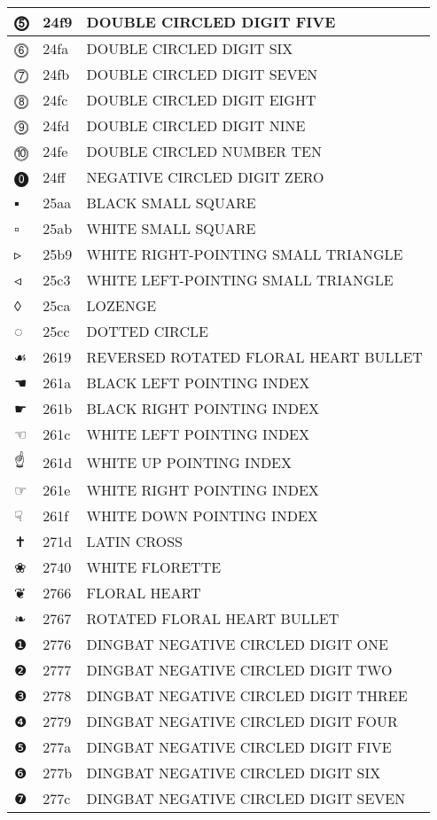 \documentclass[12pt,letterpaper,openany]{book}
\begin{document}
\begin{center}
\begin{supertabular}{|m{0.25in}|m{0.5in}|m{4in}|}
⓹ & 24f9 & DOUBLE CIRCLED DIGIT FIVE\\\hline
⓺ & 24fa & DOUBLE CIRCLED DIGIT SIX\\\hline
⓻ & 24fb & DOUBLE CIRCLED DIGIT SEVEN\\\hline
⓼ & 24fc & DOUBLE CIRCLED DIGIT EIGHT\\\hline
⓽ & 24fd & DOUBLE CIRCLED DIGIT NINE\\\hline
⓾ & 24fe & DOUBLE CIRCLED NUMBER TEN\\\hline
⓿ & 24ff & NEGATIVE CIRCLED DIGIT ZERO\\\hline
▪ & 25aa & BLACK SMALL SQUARE\\\hline
▫ & 25ab & WHITE SMALL SQUARE\\\hline
▹ & 25b9 & WHITE RIGHT-POINTING SMALL TRIANGLE\\\hline
◃ & 25c3 & WHITE LEFT-POINTING SMALL TRIANGLE\\\hline
◊ & 25ca & LOZENGE\\\hline
◌ & 25cc & DOTTED CIRCLE\\\hline
☙ & 2619 & REVERSED ROTATED FLORAL HEART BULLET\\\hline
☚ & 261a & BLACK LEFT POINTING INDEX\\\hline
☛ & 261b & BLACK RIGHT POINTING INDEX\\\hline
☜ & 261c & WHITE LEFT POINTING INDEX\\\hline
☝ & 261d & WHITE UP POINTING INDEX\\\hline
☞ & 261e & WHITE RIGHT POINTING INDEX\\\hline
☟ & 261f & WHITE DOWN POINTING INDEX\\\hline
✝ & 271d & LATIN CROSS\\\hline
❀ & 2740 & WHITE FLORETTE\\\hline
❦ & 2766 & FLORAL HEART\\\hline
❧ & 2767 & ROTATED FLORAL HEART BULLET\\\hline
❶ & 2776 & DINGBAT NEGATIVE CIRCLED DIGIT ONE\\\hline
❷ & 2777 & DINGBAT NEGATIVE CIRCLED DIGIT TWO\\\hline
❸ & 2778 & DINGBAT NEGATIVE CIRCLED DIGIT THREE\\\hline
❹ & 2779 & DINGBAT NEGATIVE CIRCLED DIGIT FOUR\\\hline
❺ & 277a & DINGBAT NEGATIVE CIRCLED DIGIT FIVE\\\hline
❻ & 277b & DINGBAT NEGATIVE CIRCLED DIGIT SIX\\\hline
❼ & 277c & DINGBAT NEGATIVE CIRCLED DIGIT SEVEN\\\hline

\end{supertabular}
\end{center}
\end{document}

